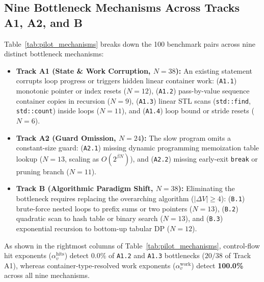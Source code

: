 \subsection{Nine Bottleneck Mechanisms Across Tracks A1, A2, and B}
Table~\ref{tab:pilot_mechanisms} breaks down the 100 benchmark pairs across nine distinct bottleneck mechanisms:
\begin{itemize}
    \item \textbf{Track A1 (State \& Work Corruption, $N=38$):} An existing statement corrupts loop progress or triggers hidden linear container work: (\texttt{A1.1}) monotonic pointer or index resets ($N=12$), (\texttt{A1.2}) pass-by-value sequence container copies in recursion ($N=9$), (\texttt{A1.3}) linear STL scans (\texttt{std::find}, \texttt{std::count}) inside loops ($N=11$), and (\texttt{A1.4}) loop bound or stride resets ($N=6$).
    \item \textbf{Track A2 (Guard Omission, $N=24$):} The slow program omits a constant-size guard: (\texttt{A2.1}) missing dynamic programming memoization table lookup ($N=13$, scaling as $O(2^{\beta N})$), and (\texttt{A2.2}) missing early-exit \texttt{break} or pruning branch ($N=11$).
    \item \textbf{Track B (Algorithmic Paradigm Shift, $N=38$):} Eliminating the bottleneck requires replacing the overarching algorithm ($|\Delta V| \ge 4$): (\texttt{B.1}) brute-force nested loops to prefix sums or two pointers ($N=13$), (\texttt{B.2}) quadratic scan to hash table or binary search ($N=13$), and (\texttt{B.3}) exponential recursion to bottom-up tabular DP ($N=12$).
\end{itemize}
As shown in the rightmost columns of Table~\ref{tab:pilot_mechanisms}, control-flow hit exponents ($\alpha_v^{\text{hits}}$) detect $0.0\%$ of \texttt{A1.2} and \texttt{A1.3} bottlenecks ($20/38$ of Track A1), whereas container-type-resolved work exponents ($\alpha_v^{\text{work}}$) detect \textbf{100.0\%} across all nine mechanisms.

